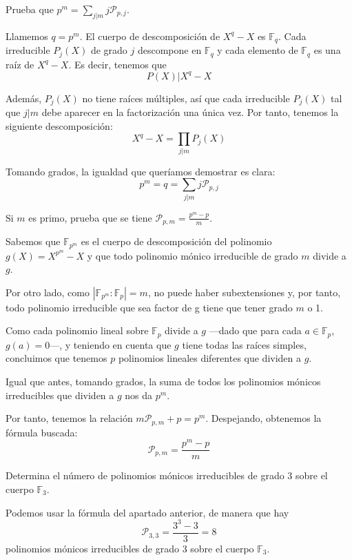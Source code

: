 \documentclass[a4paper, 11pt]{article}
\begin{document}
  \begin{apartado}
      Prueba que $p^m = \sum\limits_{j \vert m}j\mathcal{P}_{p,j}$.
  \end{apartado}

  \begin{solucion}
      Llamemos $q = p^m$.
      El cuerpo de descomposición de $X^q - X$ es $\mathbb{F}_q$. Cada irreducible $P_j(X)$ de grado $j$ descompone en $\mathbb{F}_q$ y cada elemento de $\mathbb{F}_q$ es una raíz de $X^q - X$. Es decir, tenemos que
      \[
      P(X) \vert X^q-X
      \]

      Además, $P_j(X)$ no tiene raíces múltiples, así que cada irreducible $P_j(X)$ tal que $j \vert m$ debe aparecer en la factorización una única vez. Por tanto, tenemos la siguiente descomposición:
      \[
      X^q - X = \prod_{j \vert m} P_j(X)
      \]

      Tomando grados, la igualdad que queríamos demostrar es clara:
      \[
      p^m = q = \sum\limits_{j \vert m}j\mathcal{P}_{p,j}
      \]
  \end{solucion}

  \begin{apartado}
      Si $m$ es primo, prueba que se tiene $\mathcal{P}_{p,m} = \frac{p^m - p}{m}$.
  \end{apartado}

  \begin{solucion}
      Sabemos que $\mathbb{F}_{p^{m}}$ es el cuerpo de descomposición del polinomio $g\left(X\right)=X^{p^{m}}-X$ y que todo polinomio mónico irreducible de grado $m$ divide a $g$.

      Por otro lado, como $\left|\mathbb{F}_{p^{m}}:\mathbb{F}_{p}\right|=m$, no puede haber subextensiones y, por tanto, todo polinomio irreducible que sea factor de g tiene que tener grado $m$ o 1.

      Como cada polinomio lineal sobre $\mathbb{F}_{p}$ divide a $g$ ---dado que para cada $a\in \mathbb{F}_{p}$, $g(a) = 0$---, y teniendo en cuenta que $g$ tiene todas las raíces simples, concluimos que tenemos $p$ polinomios lineales diferentes que dividen a $g$.

      Igual que antes, tomando grados, la suma de todos los polinomios mónicos irreducibles que dividen a $g$ nos da $p^{m}$.

      Por tanto, tenemos la relación $m\mathcal{P}_{p,m} + p = p^{m}$. Despejando, obtenemos la fórmula buscada:
      \[
      \mathcal{P}_{p,m} = \frac{p^{m}-p}{m}
      \]
  \end{solucion}

  \begin{apartado}
      Determina el número de polinomios mónicos irreducibles de grado 3 sobre el cuerpo $\mathbb{F}_3$.
  \end{apartado}

  \begin{solucion}
      Podemos usar la fórmula del apartado anterior, de manera que hay
      \[
      \mathcal{P}_{3,3} = \frac{3^3 - 3}{3} = 8
      \]
      polinomios mónicos irreducibles de grado 3 sobre el cuerpo $\mathbb{F}_3$.
  \end{solucion}
\end{document}
